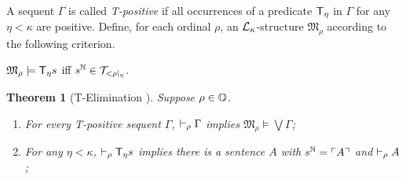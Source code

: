 \documentclass[UKenglish,cleveref,DIV=12]{scrartcl}
\newtheorem{theorem}{Theorem}
\theoremstyle{definition}
\theoremstyle{definition}
\begin{document}
A sequent $\Gamma$ is called \emph{T-positive} if all occurrences of a predicate $\mathsf{T}_\eta$ in $\Gamma$ for any $\eta<\kappa$ are positive. Define, for each ordinal $\rho$, an $\mathcal{L}_\kappa$-structure $\mathfrak{M}_\rho$ according to the following criterion.
\begin{center}
 $\mathfrak{M}_\rho\models \mathsf{T}_\eta s$ iff $s^\mathbb N\in\mathcal{T}_{<\rho|_\eta}$.
\end{center}
\begin{theorem}[T-Elimination ]\label{lem:FFTElim}\label{thm:FFTElim} Suppose $\rho\in\mathbb{O}$.
\begin{enumerate}
  \item For every T-positive sequent $\Gamma$, $\vdash_\rho \Gamma$ implies
	$\mathfrak{M}_\rho\models\bigvee\Gamma$;
  \item For any $\eta<\kappa$, $\vdash_\rho  \mathsf{T}_\eta s$ implies there is a
	sentence $A$ with $s^\mathbb N=\ulcorner{A}\urcorner$ and $\vdash_\rho  A$;
\end{enumerate}
\end{theorem}
\end{document}
